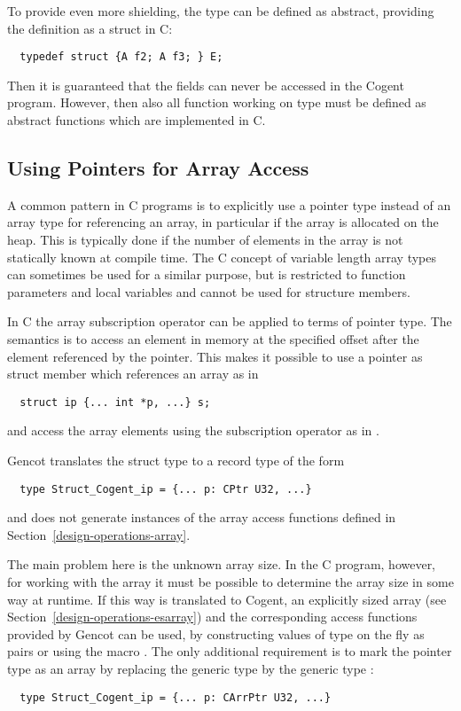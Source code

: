 To provide even more shielding, the type  can be defined as abstract, providing the definition
as a struct in C:
\begin{verbatim}
  typedef struct {A f2; A f3; } E;
\end{verbatim}
Then it is guaranteed that the fields can never be accessed in the Cogent program. However, then also 
all function working on type  must be defined as abstract functions which are implemented in C.

\subsection{Using Pointers for Array Access}
\label{app-transtype-arrpoint}

A common pattern in C programs is to explicitly use a pointer type instead of an array type for referencing an array,
in particular if the array is allocated on the heap. This is typically done if the number of elements in the
array is not statically known at compile time. The C concept of variable length array types can sometimes be
used for a similar purpose, but is restricted to function parameters and local variables and cannot be used for
structure members.

In C the array subscription operator can be applied to terms of pointer type. The semantics is to access an element 
in memory at the specified offset after the element referenced by the pointer. This makes it possible to use 
a pointer as struct member which references an array as in
\begin{verbatim}
  struct ip {... int *p, ...} s;
\end{verbatim}
and access the array elements using the subscription operator as in .

Gencot translates the struct type to a record type of the form
\begin{verbatim}
  type Struct_Cogent_ip = {... p: CPtr U32, ...}
\end{verbatim}
and does not generate instances of the array access functions defined in Section~\ref{design-operations-array}. 

The main problem here is the unknown array size. In the C program, however, for working with the array it must be
possible to determine the array size in some way at runtime. If this way is translated to Cogent, an explicitly
sized array (see Section~\ref{design-operations-esarray}) and the corresponding access functions provided by
Gencot can be used, by constructing values of type  on the fly as pairs 
or using the macro . The only additional requirement is to mark the pointer type as an array by
replacing the generic type  by the generic type :
\begin{verbatim}
  type Struct_Cogent_ip = {... p: CArrPtr U32, ...}
\end{verbatim}

